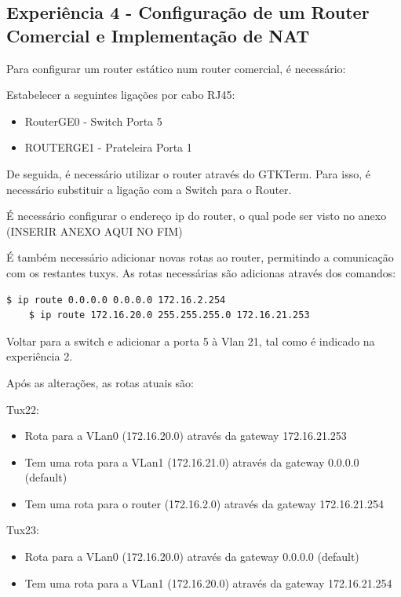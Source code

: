 \documentclass[11pt]{article}
\begin{document}
\subsection{Experiência 4 - Configuração de um Router Comercial e Implementação de NAT}

Para configurar um router estático num router comercial, é necessário:

Estabelecer a seguintes ligações por cabo RJ45:
\begin{itemize}
\item RouterGE0 - Switch Porta 5
\item ROUTERGE1 - Prateleira Porta 1  
\end{itemize}

De seguida, é necessário utilizar o router através do GTKTerm. Para isso, é necessário substituir a ligação com a Switch para o Router.

É necessário configurar o endereço ip do router, o qual pode ser visto no anexo (INSERIR ANEXO AQUI NO FIM)

É também necessário adicionar novas rotas ao router, permitindo a comunicação com os restantes tuxys. As rotas necessárias são adicionas através dos comandos:
\begin{lstlisting}[language=bash]
    $ ip route 0.0.0.0 0.0.0.0 172.16.2.254
    $ ip route 172.16.20.0 255.255.255.0 172.16.21.253
\end{lstlisting}

Voltar para a switch e adicionar a porta 5 à Vlan 21, tal como é indicado na experiência 2.


Após as alterações, as rotas atuais são:

Tux22:
\begin{itemize}
\item Rota para a VLan0 (172.16.20.0) através da gateway 172.16.21.253
\item Tem uma rota para a VLan1 (172.16.21.0) através da gateway 0.0.0.0 (default)
\item Tem uma rota para o router (172.16.2.0) através da gateway 172.16.21.254
\end{itemize}

Tux23:
\begin{itemize}
\item Rota para a VLan0 (172.16.20.0) através da gateway 0.0.0.0 (default)
\item Tem uma rota para a VLan1 (172.16.20.0) através da gateway 172.16.21.254
\end{itemize}
\end{document}
